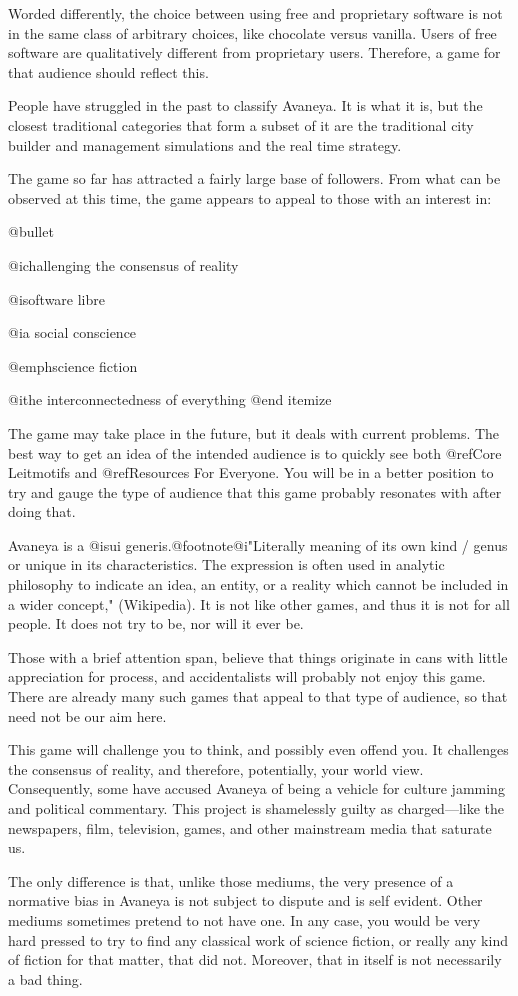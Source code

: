Worded differently, the choice between using free and proprietary software is not in the same class of arbitrary choices, like chocolate versus vanilla. Users of free software are qualitatively different from proprietary users. Therefore, a game for that audience should reflect this.

People have struggled in the past to classify Avaneya. It is what it is, but the closest traditional categories that form a subset of it are the traditional city builder and management simulations and the real time strategy.

The game so far has attracted a fairly large base of followers. From what can be observed at this time, the game appears to appeal to those with an interest in:

\itemize @bullet
\item
@i{challenging the consensus of reality}
\item
@i{software libre}
\item
@i{a social conscience}
\item
@emph{science fiction}
\item
@i{the interconnectedness of everything}
@end itemize

The game may take place in the future, but it deals with current problems. The best way to get an idea of the intended audience is to quickly see both @ref{Core Leitmotifs} and @ref{Resources For Everyone}. You will be in a better position to try and gauge the type of audience that this game probably resonates with after doing that. 

Avaneya is a @i{sui generis}.@footnote{@i{"Literally meaning of its own kind / genus or unique in its characteristics. The expression is often used in analytic philosophy to indicate an idea, an entity, or a reality which cannot be included in a wider concept,"} (Wikipedia).} It is not like other games, and thus it is not for all people. It does not try to be, nor will it ever be.

Those with a brief attention span, believe that things originate in cans with little appreciation for process, and accidentalists will probably not enjoy this game. There are already many such games that appeal to that type of audience, so that need not be our aim here.

This game will challenge you to think, and possibly even offend you. It challenges the consensus of reality, and therefore, potentially, your world view. Consequently, some have accused Avaneya of being a vehicle for culture jamming and political commentary. This project is shamelessly guilty as charged---like the newspapers, film, television, games, and other mainstream media that saturate us. 

The only difference is that, unlike those mediums, the very presence of a normative bias in Avaneya is not subject to dispute and is self evident. Other mediums sometimes pretend to not have one. In any case, you would be very hard pressed to try to find any classical work of science fiction, or really any kind of fiction for that matter, that did not. Moreover, that in itself is not necessarily a bad thing.


